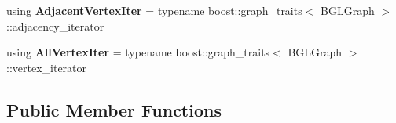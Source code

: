 \begin{DoxyCompactItemize}
\item 
\hypertarget{classgraybat_1_1graphPolicy_1_1BGL_a43c38b9bb4eab53bd2912809ceec36ff}{}using {\bfseries Adjacent\+Vertex\+Iter} = typename boost\+::graph\+\_\+traits$<$ B\+G\+L\+Graph $>$\+::adjacency\+\_\+iterator\label{classgraybat_1_1graphPolicy_1_1BGL_a43c38b9bb4eab53bd2912809ceec36ff}

\item 
\hypertarget{classgraybat_1_1graphPolicy_1_1BGL_acecbb87f46332b42010a20b89918223b}{}using {\bfseries All\+Vertex\+Iter} = typename boost\+::graph\+\_\+traits$<$ B\+G\+L\+Graph $>$\+::vertex\+\_\+iterator\label{classgraybat_1_1graphPolicy_1_1BGL_acecbb87f46332b42010a20b89918223b}

\end{DoxyCompactItemize}
\subsection*{Public Member Functions}
